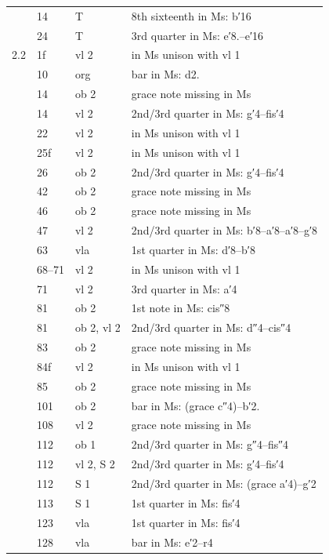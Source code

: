 \documentclass[parskip=full]{scrreprt}
\begin{document}
\begin{longtable}{lll L{10cm}}
	     & 14  & T       & 8th sixteenth in Ms: b′16 \\
	     & 24  & T       & 3rd quarter in Ms: e′8.–e′16 \\
	2.2  & 1f  & vl 2    & in Ms unison with vl 1 \\
	     & 10  & org     & bar in Ms: d2. \\
	     & 14  & ob 2    & grace note missing in Ms \\
	     & 14  & vl 2    & 2nd/3rd quarter in Ms: g′4–fis′4 \\
	     & 22  & vl 2    & in Ms unison with vl 1 \\
	     & 25f & vl 2    & in Ms unison with vl 1 \\
	     & 26  & ob 2    & 2nd/3rd quarter in Ms: g′4–fis′4 \\
	     & 42  & ob 2    & grace note missing in Ms \\
	     & 46  & ob 2    & grace note missing in Ms \\
	     & 47  & vl 2    & 2nd/3rd quarter in Ms: b′8–a′8–a′8–g′8 \\
	     & 63  & vla     & 1st quarter in Ms: d′8–b′8 \\
	     & 68–71 & vl 2  & in Ms unison with vl 1 \\
	     & 71  & vl 2    & 3rd quarter in Ms: a′4 \\
	     & 81  & ob 2    & 1st note in Ms: cis″8 \\
	     & 81  & ob 2, vl 2 & 2nd/3rd quarter in Ms: d″4–cis″4 \\
	     & 83  & ob 2    & grace note missing in Ms \\
	     & 84f & vl 2    & in Ms unison with vl 1 \\
	     & 85  & ob 2    & grace note missing in Ms \\
	     & 101 & ob 2    & bar in Ms: (grace c″4)–b′2. \\
	     & 108 & vl 2    & grace note missing in Ms \\
	     & 112 & ob 1    & 2nd/3rd quarter in Ms: g″4–fis″4 \\
	     & 112 & vl 2, S 2 & 2nd/3rd quarter in Ms: g′4–fis′4 \\
	     & 112 & S 1     & 2nd/3rd quarter in Ms: (grace a′4)–g′2 \\
	     & 113 & S 1     & 1st quarter in Ms: fis′4 \\
	     & 123 & vla     & 1st quarter in Ms: fis′4 \\
	     & 128 & vla     & bar in Ms: e′2–r4 \\

\end{longtable}
\end{document}
